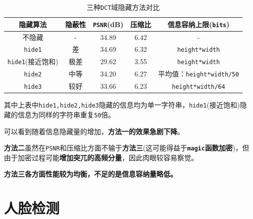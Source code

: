 \documentclass{article}
\numberwithin{figure}{section}
\numberwithin{table}{section}
\numberwithin{listing}{section}
\numberwithin{equation}{section}
\begin{document}
\begin{enumerate}
                \begin{table}[H]
                    \caption{三种\texttt{DCT}域隐藏方法对比}
                    \centering
                
                    \begin{tabular}{|c|c|c|c|c|}
                    \hline
                
                    \hline
                    \textbf{隐藏算法} & \textbf{隐蔽性} & \textbf{\texttt{PSNR}(dB)} & \textbf{压缩比} & \textbf{信息容纳上限(\texttt{bits})} \\
                    \hline
                        不隐藏 & - & 34.89 & 6.42 & - \\
                    \hline
                        \texttt{hide1} & 差 & 34.69 & 6.32 & \texttt{height*width} \\
                    \hline
                        \texttt{hide1}(接近饱和) & 极差 & 29.62 & 3.55 & \texttt{height*width} \\
                    \hline
                        \texttt{hide2} & 中等 & 34.20 & 6.27 & 平均值：\texttt{height*width/50} \\
                    \hline
                        \texttt{hide3} & 较好 & 33.66 & 6.23 & \texttt{height*width/64} \\
                    \hline

                    \hline
                    \end{tabular}
                \end{table}

                其中上表中\texttt{hide1,hide2,hide3}隐藏的信息均为单一字符串，\texttt{hide1}(接近饱和)隐藏的信息为同样的字符串重复\texttt{50}倍。

                可以看到随着信息隐藏量的增加，\textbf{方法一的效果急剧下降}。

                \textbf{方法二}虽然在\texttt{PSNR}和压缩比方面不输于\textbf{方法三}(这可能得益于\textbf{\texttt{magic}函数加密})，但由于加密过程可能\textbf{增加突兀的高频分量}，因此肉眼较容易察觉。

                \textbf{方法三各方面性能较为均衡，不足的是信息容纳量略低。}

        \end{enumerate}


    \newpage
    \section{人脸检测} %
    \label{sec:人脸检测}
\end{document}
